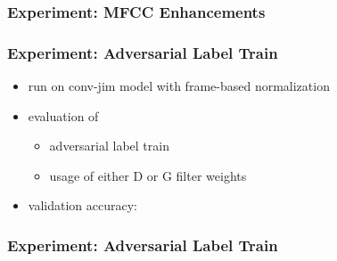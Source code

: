 \begin{frame}
  \frametitle{Experiment: MFCC Enhancements}
  \centering \vfill
  
\end{frame}

\begin{frame}
  \frametitle{Experiment: Adversarial Label Train}
  \begin{itemize}
    \item run on conv-jim model with frame-based normalization
    \item evaluation of
    \begin{itemize}
     \item adversarial label train
     \item usage of either D or G filter weights
    \end{itemize}
    \item validation accuracy:
    \vspace{-0.5cm}
    \begin{figure}[!ht]
    \centering
    \end{figure}
  \end{itemize}
\end{frame}

\begin{frame}
  \frametitle{Experiment: Adversarial Label Train}
  \centering \vfill
  
\end{frame}

